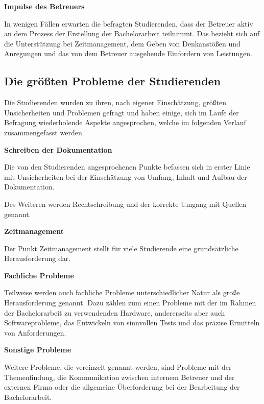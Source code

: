 \documentclass[bibliography=totoc,listof=totoc,BCOR=5mm,DIV=12,oneside]{scrbook}
\begin{document}
\par \medskip \textbf{Impulse des Betreuers}
\par In wenigen Fällen erwarten die befragten Studierenden, dass der Betreuer aktiv an dem Prozess der Erstellung der Bachelorarbeit teilnimmt. Das bezieht sich auf die Unterstützung bei Zeitmanagement, dem Geben von Denkanstößen und Anregungen und das von dem Betreuer ausgehende Einfordern von Leistungen.

\subsection{Die größten Probleme der Studierenden}
\par Die Studierenden wurden zu ihren, nach eigener Einschätzung, größten Unsicherheiten und Problemen gefragt und haben einige, sich im Laufe der Befragung wiederholende Aspekte angesprochen, welche im folgenden Verlauf zusammengefasst werden.

\par \bigskip \textbf{Schreiben der Dokumentation}
\par Die von den Studierenden angesprochenen Punkte befassen sich in erster Linie mit Unsicherheiten bei der Einschätzung von Umfang, Inhalt und Aufbau der Dokumentation. 
\par Des Weiteren werden Rechtschreibung und der korrekte Umgang mit Quellen genannt.

\par \bigskip \textbf{Zeitmanagement}
\par Der Punkt Zeitmanagement stellt für viele Studierende eine grundsätzliche Herausforderung dar.

\par \bigskip \textbf{Fachliche Probleme}
\par Teilweise werden auch fachliche Probleme unterschiedlicher Natur als große Herausforderung genannt. Dazu zählen zum einen Probleme mit der im Rahmen der Bachelorarbeit zu verwendenden Hardware, andererseits aber auch Softwareprobleme, das Entwickeln von sinnvollen Tests und das präzise Ermitteln von Anforderungen.

\par \bigskip \textbf{Sonstige Probleme}
\par Weitere Probleme, die vereinzelt genannt werden, sind Probleme mit der Themenfindung, die Kommunikation zwischen internem Betreuer und der externen Firma oder die allgemeine Überforderung bei der Bearbeitung der Bachelorarbeit.
\end{document}
